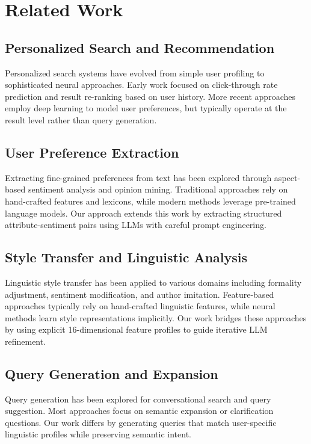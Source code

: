 \documentclass[11pt]{article}
\begin{document}
\section{Related Work}

\subsection{Personalized Search and Recommendation}

Personalized search systems have evolved from simple user profiling to sophisticated neural approaches. Early work focused on click-through rate prediction and result re-ranking based on user history. More recent approaches employ deep learning to model user preferences, but typically operate at the result level rather than query generation.

\subsection{User Preference Extraction}

Extracting fine-grained preferences from text has been explored through aspect-based sentiment analysis and opinion mining. Traditional approaches rely on hand-crafted features and lexicons, while modern methods leverage pre-trained language models. Our approach extends this work by extracting structured attribute-sentiment pairs using LLMs with careful prompt engineering.

\subsection{Style Transfer and Linguistic Analysis}

Linguistic style transfer has been applied to various domains including formality adjustment, sentiment modification, and author imitation. Feature-based approaches typically rely on hand-crafted linguistic features, while neural methods learn style representations implicitly. Our work bridges these approaches by using explicit 16-dimensional feature profiles to guide iterative LLM refinement.

\subsection{Query Generation and Expansion}

Query generation has been explored for conversational search and query suggestion. Most approaches focus on semantic expansion or clarification questions. Our work differs by generating queries that match user-specific linguistic profiles while preserving semantic intent.
\end{document}
